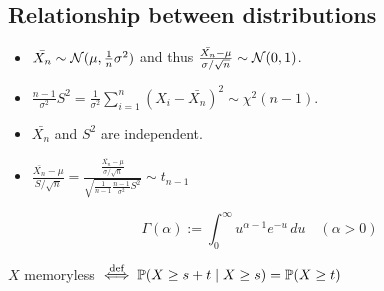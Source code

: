 \subsection*{Relationship between distributions}
\begin{center}
  
\end{center}

\begin{theorem*}
  \begin{itemize}
    \item \(\bar{X_n} \sim \Normal(\mu, \frac{1}{n}\sigma^2)\) and thus \(\frac{\bar{X_n} - \mu}{\sigma / \sqrt{n}} \sim \Normal(0, 1)\).
    \item \(\frac{n-1}{\sigma^2}S^2 = \frac{1}{\sigma^2}\sum_{i=1}^n(X_i - \bar{X_n})^2 \sim \chi^2(n-1)\).
    \item \(\bar{X_n}\) and \(S^2\) are independent.
    \item \(\frac{\bar{X_n} - \mu}{S / \sqrt{n}} = \frac{\frac{\bar{X_n} - \mu}{\sigma / \sqrt{n}}}{\sqrt{\frac{1}{n-1} \frac{n-1}{\sigma^2}S^2}} \sim t_{n-1}\)
  \end{itemize}
\end{theorem*}

\begin{definition*} \vspace{-5pt}
  \[\Gamma(\alpha) := \int_0^\infty u^{\alpha-1}e^{-u} \, du \quad (\alpha > 0)\]
\end{definition*}

\begin{definition*}[Memorylessness]
  \(X\) memoryless \(\stackrel{\text{def}}{\iff} \P(X \geq s + t \mid X \geq s) = \P(X \geq t)\)
\end{definition*}
